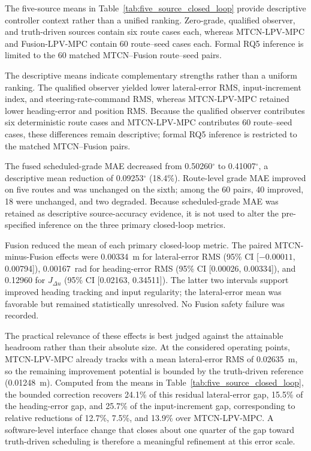 \documentclass{ieeeaccess}
\begin{document}
The five-source means in Table~\ref{tab:five_source_closed_loop} provide descriptive controller context rather than a unified ranking. Zero-grade, qualified observer, and truth-driven sources contain six route cases each, whereas MTCN-LPV-MPC and Fusion-LPV-MPC contain 60 route--seed cases each. Formal RQ5 inference is limited to the 60 matched MTCN--Fusion route--seed pairs.

The descriptive means indicate complementary strengths rather than a uniform ranking. The qualified observer yielded lower lateral-error RMS, input-increment index, and steering-rate-command RMS, whereas MTCN-LPV-MPC retained lower heading-error and position RMS. Because the qualified observer contributes six deterministic route cases and MTCN-LPV-MPC contributes 60 route--seed cases, these differences remain descriptive; formal RQ5 inference is restricted to the matched MTCN--Fusion pairs.

The fused scheduled-grade MAE decreased from 0.50260$^{\circ}$ to 0.41007$^{\circ}$, a descriptive mean reduction of 0.09253$^{\circ}$ (18.4\%). Route-level grade MAE improved on five routes and was unchanged on the sixth; among the 60 pairs, 40 improved, 18 were unchanged, and two degraded. Because scheduled-grade MAE was retained as descriptive source-accuracy evidence, it is not used to alter the pre-specified inference on the three primary closed-loop metrics.

Fusion reduced the mean of each primary closed-loop metric. The paired MTCN-minus-Fusion effects were 0.00334~m for lateral-error RMS (95\% CI [$-0.00011$, 0.00794]), 0.00167~rad for heading-error RMS (95\% CI [0.00026, 0.00334]), and 0.12960 for $J_{\Delta u}$ (95\% CI [0.02163, 0.34511]). The latter two intervals support improved heading tracking and input regularity; the lateral-error mean was favorable but remained statistically unresolved. No Fusion safety failure was recorded.

The practical relevance of these effects is best judged against the
attainable headroom rather than their absolute size. At the considered
operating points, MTCN-LPV-MPC already tracks with a mean lateral-error
RMS of 0.02635~m, so the remaining improvement potential is bounded by
the truth-driven reference (0.01248~m). Computed from the means in
Table~\ref{tab:five_source_closed_loop}, the bounded correction recovers
24.1\% of this residual lateral-error gap, 15.5\% of the heading-error
gap, and 25.7\% of the input-increment gap, corresponding to relative
reductions of 12.7\%, 7.5\%, and 13.9\% over MTCN-LPV-MPC. A
software-level interface change that closes about one quarter of the gap
toward truth-driven scheduling is therefore a meaningful refinement at
this error scale.
\end{document}
